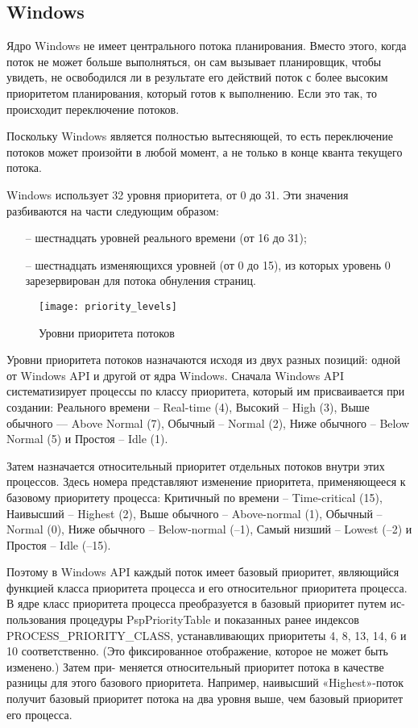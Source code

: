 \subsection{Windows}

Ядро Windows не имеет центрального потока планирования.
Вместо этого, когда поток не может больше выполняться, он
сам вызывает планировщик, чтобы увидеть, не освободился ли в
результате его действий поток с более высоким приоритетом
планирования, который готов к выполнению. Если это так, то
происходит переключение потоков.

Поскольку Windows является полностью вытесняющей, то есть
переключение потоков может произойти в любой момент, а не только
в конце кванта текущего потока.

Windows использует 32 уровня приоритета, от 0 до 31. Эти значения
разбиваются на части следующим образом:

\begin{itemize}
    \item[--] шестнадцать уровней реального времени (от 16 до 31);
    \item[--] шестнадцать изменяющихся уровней (от 0 до 15), из
        которых уровень 0 зарезервирован для потока обнуления страниц.
\end{itemize}

\begin{figure}[H]
    \centering
    \texttt{[image: priority\_levels]}
    \caption{Уровни приоритета потоков}
\end{figure}

Уровни приоритета потоков назначаются исходя из двух разных позиций:
одной от Windows API и другой от ядра Windows. Сначала Windows API
систематизирует процессы по классу приоритета, который им присваивается
при создании: Реального времени -- Real-time (4), Высокий -- High (3),
Выше обычного — Above Normal (7), Обычный -- Normal (2), Ниже
обычного -- Below Normal (5) и Простоя -- Idle (1).

Затем назначается относительный приоритет отдельных потоков внутри
этих процессов. Здесь номера представляют изменение приоритета,
применяющееся к базовому приоритету процесса: Критичный по времени
-- Time-critical (15), Наивысший -- Highest (2), Выше обычного --
Above-normal (1), Обычный -- Normal (0), Ниже обычного -- Below-normal
(–1), Самый низший -- Lowest (–2) и Простоя -- Idle (–15).

Поэтому в Windows API каждый поток имеет базовый приоритет,
являющийся функцией класса приоритета процесса и его относительног
приоритета процесса. В ядре класс приоритета процесса преобразуется
в базовый приоритет путем ис- пользования процедуры PspPriorityTable
и показанных ранее индексов PROCESS\_PRIORITY\_CLASS, устанавливающих
приоритеты 4, 8, 13, 14, 6 и 10 соответственно. (Это фиксированное
отображение, которое не может быть изменено.) Затем при- меняется
относительный приоритет потока в качестве разницы для этого базового
приоритета. Например, наивысший «Highest»-поток получит базовый
приоритет потока на два уровня выше, чем базовый приоритет его процесса.

